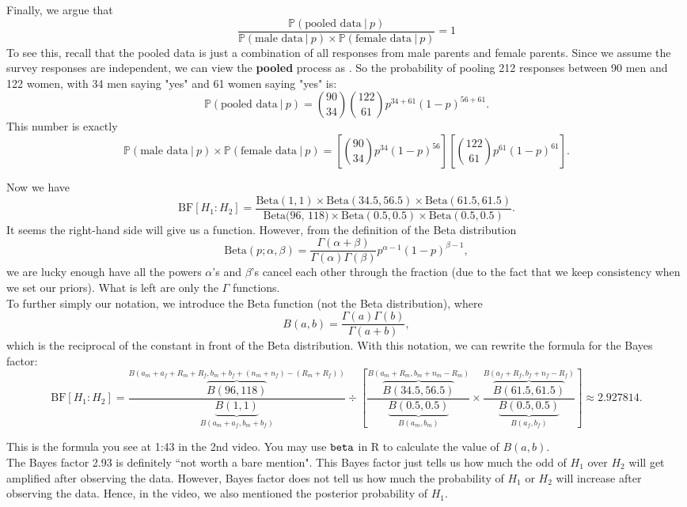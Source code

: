 \documentclass{article}
\begin{document}
Finally, we argue that 
$$ \frac{\mathbb{P}(\text{pooled data}~|~p)}{\mathbb{P}(\text{male data}~|~p)\times \mathbb{P}(\text{female data}~|~p)} = 1 $$
To see this, recall that the pooled data is just a combination of all responses from male parents and female parents. Since we assume the survey responses are independent, we can view the \textbf{pooled} process as . So the probability of pooling 212 responses between 90 men and 122 women, with 34 men saying "yes" and 61 women saying "yes" is:
$$ \mathbb{P}(\text{pooled data}~|~p) = \binom{90}{34}\binom{122}{61}p^{34+61}(1-p)^{56+61}. $$
This number is exactly
$$ \mathbb{P}(\text{male data}~|~p)\times \mathbb{P}(\text{female data}~|~p) = \left[\binom{90}{34}p^{34}(1-p)^{56}\right]\left[\binom{122}{61}p^{61}(1-p)^{61}\right]. $$

Now we have 
$$ \text{BF}[H_1:H_2] = \frac{\text{Beta}(1,1)\times \text{Beta}(34.5, 56.5)\times \text{Beta}(61.5, 61.5)}{\text{Beta(96, 118)}\times \text{Beta}(0.5, 0.5)\times \text{Beta}(0.5, 0.5)}. $$
It seems the right-hand side will give us a function. However, from the definition of the Beta distribution
$$ \text{Beta}(p;\alpha, \beta)= \frac{\Gamma(\alpha+\beta)}{\Gamma(\alpha)\Gamma(\beta)}p^{\alpha-1}(1-p)^{\beta-1}, $$
we are lucky enough have all the powers $\alpha$'s and $\beta$'s cancel each other through the fraction (due to the fact that we keep consistency when we set our priors). What is left are only the $\Gamma$ functions.\\

To further simply our notation, we introduce the Beta function (not the Beta distribution), where
$$ B(a, b) = \frac{\Gamma(a)\Gamma(b)}{\Gamma(a+b)}, $$
which is the reciprocal of the constant in front of the Beta distribution. With this notation, we can rewrite the formula for the Bayes factor:
$$ \text{BF}[H_1:H_2] = \frac{\overbrace{B(96, 118)}^{B(a_m+a_f+R_m+R_f, b_m+b_f+(n_m+n_f)-(R_m+R_f))}}{\underbrace{B(1,1)}_{B(a_m+a_f, b_m+b_f)}}\div\left[ \frac{\overbrace{B(34.5, 56.5)}^{B(a_m+R_m, b_m+n_m-R_m)}}{\underbrace{B(0.5, 0.5)}_{B(a_m,b_m)}}\times \frac{\overbrace{B(61.5, 61.5)}^{B(a_f+R_f, b_f+n_f-R_f)}}{\underbrace{B(0.5,0.5)}_{B(a_f, b_f)}}\right]\approx 2.927814. $$

This is the formula you see at 1:43 in the 2nd video. You may use $\verb|beta|$ in R to calculate the value of $B(a,b)$.\\

The Bayes factor 2.93 is definitely ``not worth a bare mention". This Bayes factor just tells us how much the odd of $H_1$ over $H_2$ will get amplified after observing the data. However, Bayes factor does not tell us how much the probability of $H_1$ or $H_2$ will increase after observing the data. Hence, in the video, we also mentioned the posterior probability of $H_1$.
\end{document}
